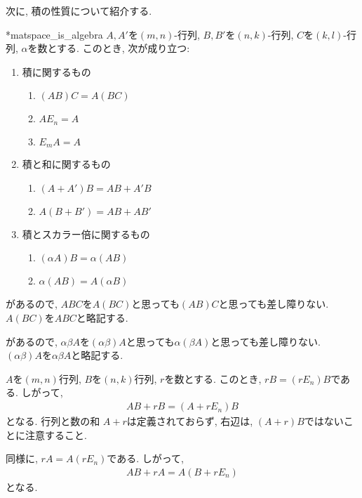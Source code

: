 次に, 積の性質について紹介する.
\begin{prop}
  \provelater**{matspace_is_algebra}
  $A,A'$を$(m,n)$-行列,
  $B,B'$を$(n,k)$-行列,
  $C$を$(k,l)$-行列,
  $\alpha$を数とする.
  このとき, 次が成り立つ:
  \begin{enumerate}
  \item 積に関するもの
    \begin{enumerate}
    \item {}
      \label{item:prod:c}
      $(AB)C=A(BC)$
    \item {}
      $AE_n=A$
    \item {}
      $E_m A=A$
    \end{enumerate}
  \item 積と和に関するもの
    \begin{enumerate}      
    \item {}
      $(A+A')B=AB+A'B$
    \item {}
      $A(B+B')=AB+AB'$
    \end{enumerate}
  \item 積とスカラー倍に関するもの
    \begin{enumerate}      
    \item
      \label{item:act:c}
      $(\alpha A)B=\alpha(AB)$
    \item
      $\alpha (AB)=A(\alpha B)$
    \end{enumerate}
  \end{enumerate}
\end{prop}

\begin{remark}
  があるので,
  $ABC$を$A(BC)$と思っても$(AB)C$と思っても差し障りない.
  $A(BC)$を$ABC$と略記する.
\end{remark}
\begin{remark}
  があるので,
  $\alpha \beta A$を$(\alpha \beta) A$と思っても$\alpha (\beta A)$と思っても差し障りない.
  $(\alpha \beta) A$を$\alpha \beta A$と略記する.
\end{remark}

\begin{remark}
  $A$を$(m,n)$行列,
  $B$を$(n,k)$行列,
  $r$を数とする.
  このとき,
  $rB=(rE_n)B$である.
  しがって,
  \begin{align*}
    AB+rB = (A+rE_n)B
  \end{align*}
  となる.
  行列と数の和
  $A+r$は定義されておらず,
  右辺は, $(A+r)B$ではないことに注意すること.

  同様に,
  $rA=A(rE_n)$である.
  しがって,
  \begin{align*}
    AB+rA = A(B+rE_n)
  \end{align*}
  となる.  
\end{remark}

